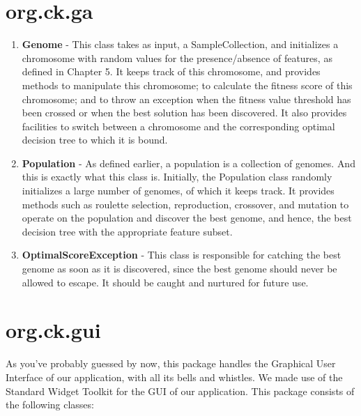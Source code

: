 \documentclass[12pt]{report}
\begin{document}
\section{org.ck.ga}


\begin{enumerate}
\item{\textbf{Genome}} - This class takes as input, a SampleCollection, and initializes a chromosome with random values for the presence/absence of features, as defined in Chapter 5. It keeps track of this chromosome, and provides methods to manipulate this chromosome; to calculate the fitness score of this chromosome; and to throw an exception when the fitness value threshold has been crossed or when the best solution has been discovered. It also provides facilities to switch between a chromosome and the corresponding optimal decision tree to which it is bound.


\item{\textbf{Population}} - As defined earlier, a population is a collection of genomes. And this is exactly what this class is. Initially, the Population class randomly initializes a large number of genomes, of which it keeps track. It provides methods such as roulette selection, reproduction, crossover, and mutation to operate on the population and discover the best genome, and hence, the best decision tree with the appropriate feature subset.

\item{\textbf{OptimalScoreException}} - This class is responsible for catching the best genome as soon as it is discovered, since the best genome should never be allowed to escape. It should be caught and nurtured for future use.

\end{enumerate}


\section{org.ck.gui}

As you've probably guessed by now, this package handles the Graphical User Interface of our application, with all its bells and whistles. We made use of the Standard Widget Toolkit for the GUI of our application. This package consists of the following classes:
\end{document}
